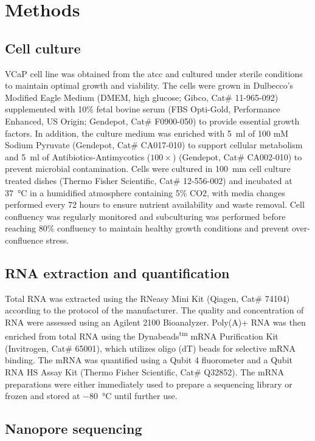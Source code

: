 \documentclass[pdflatex,sn-nature, lineno]{sn-jnl}%
\begin{document}
\section{Methods}\label{sec:methods}

\subsection{Cell culture}

VCaP cell line was obtained from the \gls{atcc} and cultured under sterile conditions to maintain optimal growth and viability.
The cells were grown in Dulbecco's Modified Eagle Medium (DMEM, high glucose; Gibco, Cat\# 11-965-092) supplemented with 10\% fetal bovine serum (FBS Opti-Gold, Performance Enhanced, US Origin; Gendepot, Cat\# F0900-050) to provide essential growth factors.
In addition, the culture medium was enriched with \SI{5}{\ml} of 100 mM Sodium Pyruvate (Gendepot, Cat\# CA017-010) to support cellular metabolism and \SI{5}{\ml} of Antibiotics-Antimycotics (\( 100\times \)) (Gendepot, Cat\# CA002-010) to prevent microbial contamination.
Cells were cultured in \SI{100}{\mm} cell culture treated dishes (Thermo Fisher Scientific, Cat\# 12-556-002) and incubated at \SI{37}{\degreeCelsius} in a humidified atmosphere containing 5\% CO2, with media changes performed every 72 hours to ensure nutrient availability and waste removal.
Cell confluency was regularly monitored and subculturing was performed before reaching 80\% confluency to maintain healthy growth conditions and prevent over-confluence stress.

\subsection{RNA extraction and quantification}

Total RNA was extracted using the RNeasy Mini Kit (Qiagen, Cat\# 74104) according to the protocol of the manufacturer.
The quality and concentration of RNA were assessed using an Agilent 2100 Bioanalyzer.
Poly(A)+ RNA was then enriched from total RNA using the Dynabeads\textsuperscript{tm} mRNA Purification Kit (Invitrogen, Cat\# 65001), which utilizes oligo (dT) beads for selective mRNA binding.
The mRNA was quantified using a Qubit 4 fluorometer and a Qubit RNA HS Assay Kit (Thermo Fisher Scientific, Cat\# Q32852).
The mRNA preparations were either immediately used to prepare a sequencing library or frozen and stored at \SI{-80}{\degreeCelsius} until further use.

\subsection{Nanopore sequencing}
\end{document}
